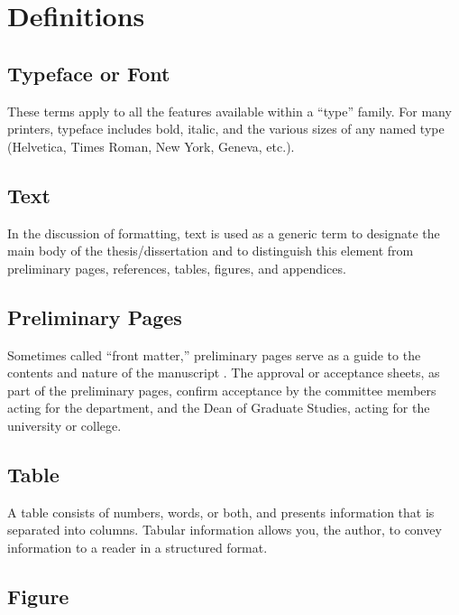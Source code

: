 \section{Definitions}
\label{sec:Definitions}


\subsection{Typeface or Font}
\label{sec:DefTypefaceOrFont}

These terms apply to all the features available within a ``type''
family. For many printers, typeface includes bold, italic, and the
various sizes of any named type (Helvetica, Times Roman, New York,
Geneva, etc.).


\subsection{Text}
\label{sec:DefText}

In the discussion of formatting, text is used as a generic term to
designate the main body of the the\-sis/dis\-ser\-ta\-tion and to
distinguish this element from preliminary pages, references, tables,
figures, and appendices.


\subsection{Preliminary Pages}
\label{sec:DefPreliminaryPages}

Sometimes called ``front matter,'' preliminary pages serve as a guide
to the contents and nature of the manuscript \cite{chicago1982}. The
approval or acceptance sheets, as part of the preliminary pages,
confirm acceptance by the committee members acting for the department,
and the Dean of Graduate Studies, acting for the university or
college.


\subsection{Table}
\label{sec:DefTable}

A table consists of numbers, words, or both, and presents information
that is separated into columns. Tabular information allows you, the
author, to convey information to a reader in a structured format.


\subsection{Figure}
\label{sec:DefFigure}

